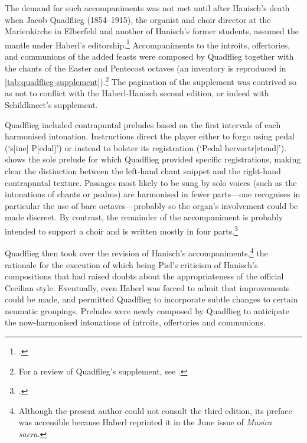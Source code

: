 The demand for such accompaniments was not met until after Hanisch's death when Jacob Quadflieg (1854--1915), the organist and choir director at the Marienkirche in Elberfeld and another of Hanisch's former students, assumed the mantle under Haberl's editorship.\footcite[For a brief Anglophone description of Quadflieg's credentials see][22]{DeacyContinentalOrganistsCatholic2005}
Accompaniments to the introits, offertories, and communions of the added feasts were composed by Quadflieg together with the chants of the Easter and Pentecost octaves (an inventory is reproduced in \cref{tab:quadflieg-supplement}).\footnote{For a review of Quadflieg's supplement, see .}
The pagination of the supplement was contrived so as not to conflict with the Haberl-Hanisch second edition, or indeed with Schildknect's supplement.

Quadflieg included contrapuntal preludes based on the first intervals of each harmonised intonation.
Instructions direct the player either to forgo using pedal (`s[ine] P[edal]') or instead to bolster its registration (`Pedal hervortr[etend]').
 shows the sole prelude for which Quadflieg provided specific registrations, making clear the distinction between the left-hand chant snippet and the right-hand contrapuntal texture.
Passages most likely to be sung by solo voices (such as the intonations of chants or psalms) are harmonised in fewer parts---one recognises in particular the use of bare octaves---probably so the organ's involvement could be made discreet.
By contrast, the remainder of the accompaniment is probably intended to support a choir and is written mostly in four parts.\footcite[pp.~iv, (45), 103]{QuadfliegSupplementumadOrganum1894}

Quadflieg then took over the revision of Hanisch's accompaniments,\footnote{Although the present author could not consult the third edition, its preface was accessible because Haberl reprinted it in the June issue of \emph{Musica sacra}.}
the rationale for the execution of which being Piel's criticism of Hanisch's compositions that had raised doubts about the appropriateness of the official Cecilian style.
Eventually, even Haberl was forced to admit that improvements could be made, and permitted Quadflieg to incorporate subtle changes to certain neumatic groupings.
Preludes were newly composed by Quadflieg to anticipate the now-harmonised intonations of introits, offertories and communions.

